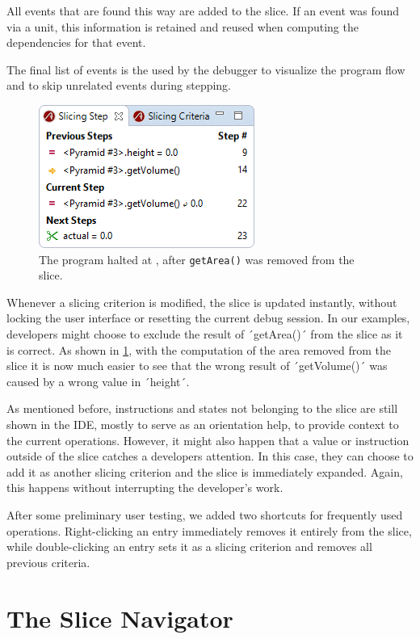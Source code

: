 All events that are found this way are added to the slice.
If an event was found via a unit, this information is retained and reused when computing the dependencies for that event.

The final list of events is the used by the debugger to visualize the program flow and to skip unrelated events during stepping.

\begin{figure}
	\centering
		\includegraphics[width=0.40\linewidth]{img/slice2.png}
	\caption{The program halted at , after \lstinline{getArea()} was removed from the slice.}
	\label{fig:slice2}
\end{figure}

Whenever a slicing criterion is modified, the slice is updated instantly, without locking the user interface or resetting the current debug session.
In our examples, developers might choose to exclude the result of ´getArea()´ from the slice as it is correct.
As shown in \cref{fig:slice2}, with the computation of the area removed from the slice it is now much easier to see that the wrong result of ´getVolume()´ was caused by a wrong value in ´height´.

As mentioned before, instructions and states not belonging to the slice are still shown in the IDE, mostly to serve as an orientation help, to provide context to the current operations.
However, it might also happen that a value or instruction outside of the slice catches a developers attention.
In this case, they can choose to add it as another slicing criterion and the slice is immediately expanded.
Again, this happens without interrupting the developer's work.

After some preliminary user testing, we added two shortcuts for frequently used operations.
Right-clicking an entry immediately removes it entirely from the slice, while double-clicking an entry sets it as a slicing criterion and removes all previous criteria.
\tmpEnd

\section{The Slice Navigator}


